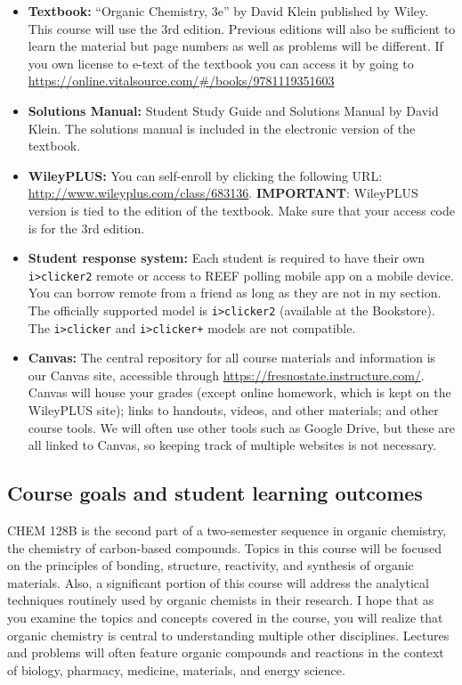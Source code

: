 \begin{itemize}
\tightlist
\item
  \textbf{Textbook:} ``Organic Chemistry, 3e'' by David Klein published
  by Wiley. This course will use the 3rd edition. Previous editions will
  also be sufficient to learn the material but page numbers as well as
  problems will be different. If you own license to e-text of the
  textbook you can access it by going to
  \url{https://online.vitalsource.com/\#/books/9781119351603}
\item
  \textbf{Solutions Manual:} Student Study Guide and Solutions Manual by
  David Klein. The solutions manual is included in the electronic
  version of the textbook.
\item
  \textbf{WileyPLUS:} You can self-enroll by clicking the following URL:
  \url{http://www.wileyplus.com/class/683136}. \textbf{IMPORTANT}:
  WileyPLUS version is tied to the edition of the textbook. Make sure
  that your access code is for the 3rd edition.
\item
  \textbf{Student response system:} Each student is required to have
  their own \texttt{i\textgreater{}clicker2} remote or access to REEF
  polling mobile app on a mobile device. You can borrow remote from a
  friend as long as they are not in my section. The officially supported
  model is \texttt{i\textgreater{}clicker2} (available at the
  Bookstore). The \texttt{i\textgreater{}clicker} and
  \texttt{i\textgreater{}clicker+} models are not compatible.
\item
  \textbf{Canvas:} The central repository for all course materials and
  information is our Canvas site, accessible through
  \url{https://fresnostate.instructure.com/}. Canvas will house your
  grades (except online homework, which is kept on the WileyPLUS site);
  links to handouts, videos, and other materials; and other course
  tools. We will often use other tools such as Google Drive, but these
  are all linked to Canvas, so keeping track of multiple websites is not
  necessary.
\end{itemize}

\hypertarget{course-goals-and-student-learning-outcomes}{%
\subsection{Course goals and student learning
outcomes}\label{course-goals-and-student-learning-outcomes}}

CHEM 128B is the second part of a two-semester sequence in organic
chemistry, the chemistry of carbon-based compounds. Topics in this
course will be focused on the principles of bonding, structure,
reactivity, and synthesis of organic materials. Also, a significant
portion of this course will address the analytical techniques routinely
used by organic chemists in their research. I hope that as you examine
the topics and concepts covered in the course, you will realize that
organic chemistry is central to understanding multiple other
disciplines. Lectures and problems will often feature organic compounds
and reactions in the context of biology, pharmacy, medicine, materials,
and energy science.

